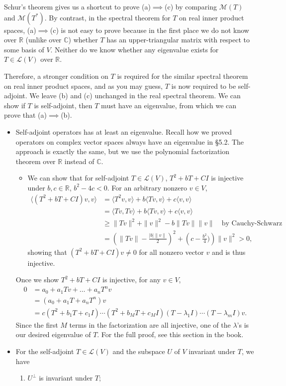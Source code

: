 \documentclass{article}
\newcommand{\R}{\mathbb{R}}
\newcommand{\C}{\mathbb{C}}
\newcommand{\inp}[2]{\langle #1, #2 \rangle}
\newcommand{\nm}[1]{\| #1 \|}
\newcommand{\LV}{\mathcal{L}(V)}
\newcommand{\M}{\mathcal{M}}
\begin{document}
Schur's theorem gives us a shortcut to prove (a)$\implies$(c) by comparing $\M(T)$ and $\M(T^*)$. By contrast, in the spectral theorem for $T$ on real inner product spaces, (a)$\implies$(c) is not easy to prove because in the first place we do not know over $\R$ (unlike over $\C$) whether $T$ has an upper-triangular matrix with respect to some basis of $V$. Neither do we know whether any eigenvalue exists for $T \in \LV$ over $\R$.

Therefore, a stronger condition on $T$ is required for the similar spectral theorem on real inner product spaces, and as you may guess, $T$ is now required to be self-adjoint. We leave (b) and (c) unchanged in the real spectral theorem. We can show if $T$ is self-adjoint, then $T$ must have an eigenvalue, from which we can prove that (a)$\implies$(b).
    \begin{itemize}
    \item Self-adjoint operators has at least an eigenvalue. Recall how we proved operators on complex vector spaces always have an eigenvalue in \S 5.2. The approach is exactly the same, but we use the polynomial factorization theorem over $\R$ instead of $\C$.
    \begin{itemize}
        \item We can show that for self-adjoint $T \in \LV$, $T^2+bT+CI$ is injective under $b,c\in\R$, $b^2-4c<0$. For an arbitrary nonzero $v \in V$,
        \begin{align*}
            \inp{(T^2+bT+CI)v}{v} & = \inp{T^2v}{v}+b\inp{Tv}{v}+c\inp{v}{v} \\
            & = \inp{Tv}{Tv}+b\inp{Tv}{v}+c\inp{v}{v} \\
            & \geq \nm{Tv}^2+\nm{v}^2 -b\nm{Tv}\nm{v} \quad \text{by Cauchy-Schwarz}\\
            & = \left(\nm{Tv}-\frac{|b|\nm{v}}{2}\right)^2 + \left(c - \frac{b^2}{4})\right)\nm{v}^2 > 0,
        \end{align*}
        showing that $(T^2+bT+CI)v \not= 0$ for all nonzero vector $v$ and is thus injective.
    \end{itemize}
    Once we show $T^2+bT+CI$ is injective, for any $v \in V$,
    \begin{align*}
        0 & = a_0+a_1Tv+\dots+a_nT^nv \\
        & = (a_0+a_1T+a_nT^n) v \\
        & = c(T^2+b_1T+c_1I)\cdots(T^2+b_MT+c_MI)(T-\lambda_1I)\cdots(T-\lambda_mI)v.
    \end{align*}
    Since the first $M$ terms in the factorization are all injective, one of the $\lambda$'s is our desired eigenvalue of $T$. For the full proof, see this section in the book.
    \item For the self-adjoint $T \in \LV$ and the subspace $U$ of $V$ invariant under $T$, we have
    \begin{enumerate}[label=(\alph*)]
        \item $U^\perp$ is invariant under $T$;
        

\end{enumerate}
\end{itemize}
\end{document}
